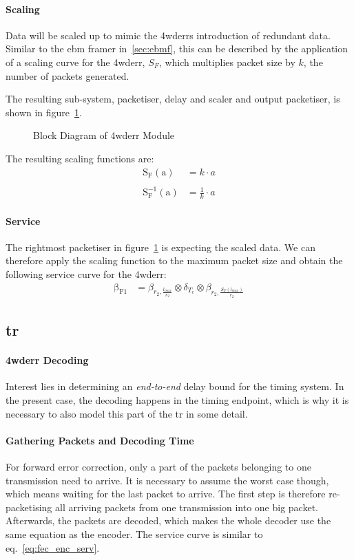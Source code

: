 \paragraph{Scaling}
Data will be scaled up to mimic the \gls{4wderr}s introduction of redundant data.
Similar to the \gls{ebm} framer in~\ref{sec:ebmf}, this can be described by the application of a scaling curve for the \gls{4wderr}, $S_F$, 
which multiplies packet size by $k$, the number of packets generated. 
\par
The resulting sub-system, packetiser, delay and scaler and output packetiser,
is shown in figure~\ref{fig:fec}.
\begin{figure}[H]
  \centering
  \def\svgwidth{0.6875\textwidth}
  
  \caption{Block Diagram of \gls{4wderr} Module}
  \label{fig:fec}
\end{figure}
\noindent
The resulting scaling functions are:
%
\begin{equation}
\begin{aligned}
\mathrm{S_{F}(a)} &= k \cdot a \\
\\
\mathrm{S^{-1}_{F}(a)} &= \frac{1}{k} \cdot a
\end{aligned}
\end{equation}
%
\paragraph{Service}
The rightmost packetiser in figure~\ref{fig:fec} is expecting the scaled data. We can therefore apply the scaling function to the maximum packet size and obtain
the following service curve for the \gls{4wderr}: 
%
\begin{align}
\mathrm{\beta_{F1}} &= \beta_{r_2,\frac{l_{max}}{r_2}} \otimes \delta_{T_e} \otimes \beta_{r_2,\frac{S_F\left(l_{max}\right)}{r_2}} \label{eq:fec_enc_serv}
\end{align}
%
\subsection{\gls{tr}}
\paragraph{\gls{4wderr} Decoding}
Interest lies in determining an \emph{end-to-end} delay bound for the timing system. 
In the present case, the decoding happens in the timing endpoint, which is why it is necessary to also model this part of the \gls{tr} in some detail.
\paragraph{Gathering Packets and Decoding Time}
For forward error correction, only a part of the packets belonging to one transmission need to arrive.
It is necessary to assume the worst case though, which means waiting for the last packet to arrive.
The first step is therefore re-packetising all arriving packets from one transmission into one big packet.
Afterwards, the packets are decoded, which makes the whole decoder use the same equation as the encoder.
The service curve is similar to eq.~\ref{eq:fec_enc_serv}.
